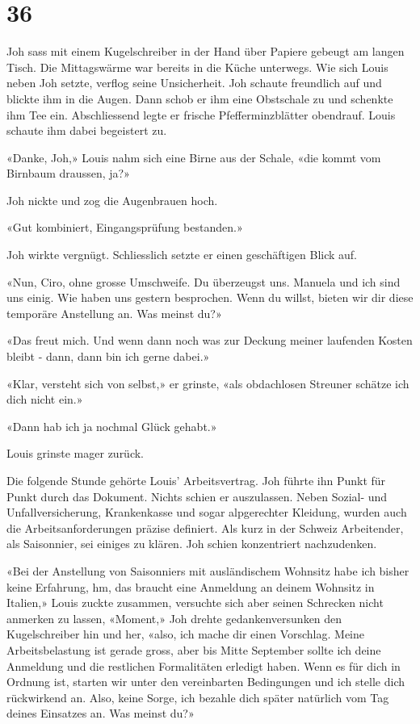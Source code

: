 \chapter{36}



Joh sass mit einem Kugelschreiber in der Hand über Papiere gebeugt am
langen Tisch. Die Mittagswärme war bereits in die Küche unterwegs. Wie
sich Louis neben Joh setzte, verflog seine Unsicherheit. Joh schaute freundlich auf und blickte ihm in die Augen.
Dann schob er ihm eine Obstschale zu und schenkte ihm Tee ein.
Abschliessend legte er frische Pfefferminzblätter obendrauf. Louis
schaute ihm dabei begeistert zu. 

«Danke, Joh,» Louis nahm sich eine Birne aus der Schale, «die kommt vom
Birnbaum draussen, ja?»

Joh nickte und zog die Augenbrauen hoch.

«Gut kombiniert, Eingangsprüfung bestanden.»

Joh wirkte vergnügt. Schliesslich setzte er einen geschäftigen Blick
auf.

«Nun, Ciro, ohne grosse Umschweife. Du überzeugst uns. Manuela und ich
sind uns einig. Wie haben uns gestern besprochen. Wenn du willst, bieten
wir dir diese temporäre Anstellung an. Was meinst du?»

«Das freut mich. Und wenn dann noch was zur Deckung meiner laufenden Kosten bleibt - dann, dann bin ich gerne dabei.»

«Klar, versteht sich von selbst,» er grinste, «als obdachlosen
Streuner schätze ich dich nicht ein.»

«Dann hab ich ja nochmal Glück gehabt.»

Louis grinste mager zurück.

Die folgende Stunde gehörte Louis’ Arbeitsvertrag. Joh führte ihn Punkt für Punkt durch das Dokument.
Nichts schien er auszulassen. Neben Sozial- und Unfallversicherung,
Krankenkasse und sogar alpgerechter Kleidung, wurden auch die
Arbeitsanforderungen präzise definiert. Als kurz in der Schweiz
Arbeitender, als Saisonnier, sei einiges zu klären. Joh schien konzentriert nachzudenken.

«Bei der Anstellung von Saisonniers mit ausländischem Wohnsitz habe ich bisher keine Erfahrung, hm, das braucht eine Anmeldung an deinem Wohnsitz in Italien,» Louis zuckte zusammen, versuchte sich aber seinen Schrecken nicht anmerken zu lassen, «Moment,» Joh drehte gedankenversunken den Kugelschreiber hin und her, «also, ich mache dir einen Vorschlag. Meine Arbeitsbelastung ist gerade gross, aber bis Mitte September sollte ich deine Anmeldung und die restlichen Formalitäten erledigt haben. Wenn es für dich in Ordnung ist, starten wir unter den vereinbarten Bedingungen und ich stelle dich rückwirkend an. Also, keine Sorge, ich bezahle dich später natürlich vom Tag deines Einsatzes an. Was meinst du?»

